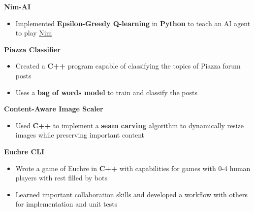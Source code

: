 \documentclass[letterpaper,11pt]{article}
\makeatletter
\newcommand{\resumeSingleItem}[1]{
  \item\small{
    #1\vspace{-2pt}
  }
}
\newcommand{\resumeProjectHeading}[1]{
  \vspace{-3pt}\item
  \textbf{#1}\vspace{-5pt}
}
\newcommand{\resumeItemListStart}{\begin{itemize}[leftmargin=*]}
\newcommand{\resumeItemListEnd}{\end{itemize}\vspace{-5pt}}
\makeatother
\begin{document}
\vspace{2pt}

\resumeProjectHeading{Nim-AI}
\resumeItemListStart
\resumeSingleItem{Implemented \textbf{Epsilon-Greedy Q-learning} in \textbf{Python} to teach an AI agent to play \href{https://en.wikipedia.org/wiki/Nim}{Nim}}
\resumeItemListEnd

\resumeProjectHeading{Piazza Classifier}
\resumeItemListStart
\resumeSingleItem{Created a \textbf{C++} program capable of classifying the topics of Piazza forum posts}
\resumeSingleItem{Uses a \textbf{bag of words model} to train and classify the posts}
\resumeItemListEnd

\resumeProjectHeading{Content-Aware Image Scaler}
\resumeItemListStart
\resumeSingleItem{Used \textbf{C++} to implement a \textbf{seam carving} algorithm to dynamically resize images while preserving important content}
\resumeItemListEnd

\resumeProjectHeading{Euchre CLI}
\resumeItemListStart
\resumeSingleItem{Wrote a game of Euchre in \textbf{C++} with capabilities for games with 0-4 human players with rest filled by bots}
\resumeSingleItem{Learned important collaboration skills and developed a workflow with others for implementation and unit tests}
\resumeItemListEnd


\end{document}
